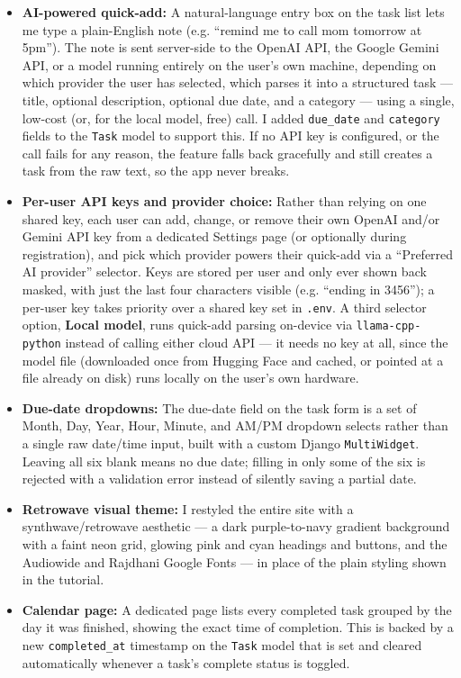 \documentclass[11pt]{article}
\begin{document}
\begin{itemize}
  \item \textbf{AI-powered quick-add:} A natural-language entry box on the task list lets me type a plain-English note (e.g. ``remind me to call mom tomorrow at 5pm''). The note is sent server-side to the OpenAI API, the Google Gemini API, or a model running entirely on the user's own machine, depending on which provider the user has selected, which parses it into a structured task --- title, optional description, optional due date, and a category --- using a single, low-cost (or, for the local model, free) call. I added \texttt{due\_date} and \texttt{category} fields to the \texttt{Task} model to support this. If no API key is configured, or the call fails for any reason, the feature falls back gracefully and still creates a task from the raw text, so the app never breaks.
  \item \textbf{Per-user API keys and provider choice:} Rather than relying on one shared key, each user can add, change, or remove their own OpenAI and/or Gemini API key from a dedicated Settings page (or optionally during registration), and pick which provider powers their quick-add via a ``Preferred AI provider'' selector. Keys are stored per user and only ever shown back masked, with just the last four characters visible (e.g. ``ending in 3456''); a per-user key takes priority over a shared key set in \texttt{.env}. A third selector option, \textbf{Local model}, runs quick-add parsing on-device via \texttt{llama-cpp-python} instead of calling either cloud API --- it needs no key at all, since the model file (downloaded once from Hugging Face and cached, or pointed at a file already on disk) runs locally on the user's own hardware.
  \item \textbf{Due-date dropdowns:} The due-date field on the task form is a set of Month, Day, Year, Hour, Minute, and AM/PM dropdown selects rather than a single raw date/time input, built with a custom Django \texttt{MultiWidget}. Leaving all six blank means no due date; filling in only some of the six is rejected with a validation error instead of silently saving a partial date.
  \item \textbf{Retrowave visual theme:} I restyled the entire site with a synthwave/retrowave aesthetic --- a dark purple-to-navy gradient background with a faint neon grid, glowing pink and cyan headings and buttons, and the Audiowide and Rajdhani Google Fonts --- in place of the plain styling shown in the tutorial.
  \item \textbf{Calendar page:} A dedicated page lists every completed task grouped by the day it was finished, showing the exact time of completion. This is backed by a new \texttt{completed\_at} timestamp on the \texttt{Task} model that is set and cleared automatically whenever a task's complete status is toggled.

\end{itemize}
\end{document}

